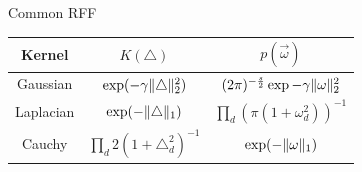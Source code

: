 \documentclass[10pt]{../Formats/RU}
\begin{document}
\begin{frame}{Common RFF}
  \centering
  \begin{tabular}{c c c}
    Kernel & $K(\triangle)$ & $p(\vec{\omega})$ \\
    \hline
    Gaussian & $\exp(-\gamma\lVert\triangle\rVert_2^2)$ & $(2\pi)^{-\frac{s}{2}}\exp{-\gamma\lVert\mathbf{\omega}\rVert_2^2}$\\
    Laplacian & $\exp(-\lVert\triangle\rVert_1)$ & $\prod\limits_{d}(\pi(1+\omega_d^2))^{-1}$\\
    Cauchy & $\prod\limits_{d}2(1+\triangle_d^2)^{-1}$ & $\exp(-\lVert\mathbf{\omega}\rVert_1)$
  \end{tabular}
\end{frame}
\end{document}
